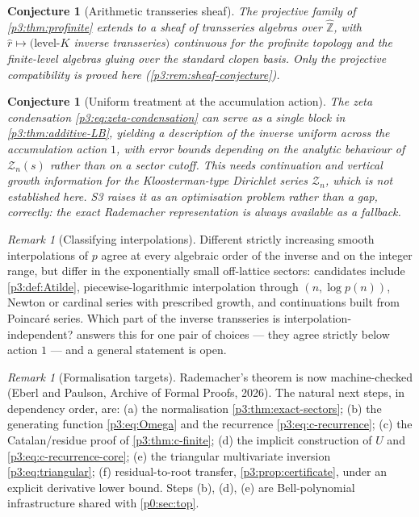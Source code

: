 \documentclass[11pt,a4paper,oneside]{book}
\theoremstyle{plain}
\newtheorem{conjecture}[theorem]{Conjecture}
\theoremstyle{definition}
\theoremstyle{remark}
\newtheorem{remark}[theorem]{Remark}
\newcommand{\Int}{\mathbb{Z}}
\begin{document}
\begin{conjecture}[Arithmetic transseries sheaf]\label{p3:conj:sheaf}
The projective family of \cref{p3:thm:profinite} extends to a sheaf of transseries algebras over
$\widehat{\Int}$, with $\widehat r\mapsto(\text{level-}K$ inverse transseries$)$ continuous for
the profinite topology and the finite-level algebras gluing over the standard clopen basis. Only
the projective compatibility is proved here (\cref{p3:rem:sheaf-conjecture}).
\end{conjecture}

\begin{conjecture}[Uniform treatment at the accumulation action]
\label{p3:conj:uniform-accumulation}
The zeta condensation \cref{p3:eq:zeta-condensation} can serve as a single block in
\cref{p3:thm:additive-LB}, yielding a description of the inverse uniform across the accumulation
action $1$, with error bounds depending on the analytic behaviour of $\mathcal{Z}_{n}(s)$ rather
than on a sector cutoff. This needs continuation and vertical growth information for the
Kloosterman-type Dirichlet series $\mathcal{Z}_{n}$, which is not established here. S3 raises it
as an optimisation problem rather than a gap, correctly: the exact Rademacher representation is
always available as a fallback.
\end{conjecture}

\begin{remark}[Classifying interpolations]\label{p3:rem:interp-problem}
Different strictly increasing smooth interpolations of $p$ agree at every algebraic order of the
inverse and on the integer range, but differ in the exponentially small off-lattice sectors:
candidates include \cref{p3:def:Atilde}, piecewise-logarithmic interpolation through $(n,\log
p(n))$, Newton or cardinal series with prescribed growth, and continuations built from Poincar\'e
series. Which part of the inverse transseries is interpolation-independent?
 answers this for one pair of choices --- they agree strictly below
action $1$ --- and a general statement is open.
\end{remark}

\begin{remark}[Formalisation targets]\label{p3:rem:formalisation}
Rademacher's theorem is now machine-checked (Eberl and Paulson, Archive of Formal Proofs, 2026).
The natural next steps, in dependency order, are: (a) the normalisation
\cref{p3:thm:exact-sectors}; (b) the generating function \cref{p3:eq:Omega} and the recurrence
\cref{p3:eq:c-recurrence}; (c) the Catalan/residue proof of \cref{p3:thm:c-finite}; (d) the
implicit construction of $U$ and \cref{p3:eq:c-recurrence-core}; (e) the triangular multivariate
inversion \cref{p3:eq:triangular}; (f) residual-to-root transfer, \cref{p3:prop:certificate},
under an explicit derivative lower bound. Steps (b), (d), (e) are Bell-polynomial infrastructure
shared with \cref{p0:sec:top}.
\end{remark}
\end{document}

